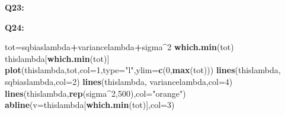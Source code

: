 \documentclass[]{article}
\newenvironment{Shaded}{\begin{snugshade}}{\end{snugshade}}
\newcommand{\KeywordTok}[1]{\textcolor[rgb]{0.13,0.29,0.53}{\textbf{#1}}}
\newcommand{\DataTypeTok}[1]{\textcolor[rgb]{0.13,0.29,0.53}{#1}}
\newcommand{\DecValTok}[1]{\textcolor[rgb]{0.00,0.00,0.81}{#1}}
\newcommand{\StringTok}[1]{\textcolor[rgb]{0.31,0.60,0.02}{#1}}
\newcommand{\CommentTok}[1]{\textcolor[rgb]{0.56,0.35,0.01}{\textit{#1}}}
\newcommand{\OtherTok}[1]{\textcolor[rgb]{0.56,0.35,0.01}{#1}}
\newcommand{\ControlFlowTok}[1]{\textcolor[rgb]{0.13,0.29,0.53}{\textbf{#1}}}
\newcommand{\OperatorTok}[1]{\textcolor[rgb]{0.81,0.36,0.00}{\textbf{#1}}}
\newcommand{\NormalTok}[1]{#1}
\begin{document}
\textbf{Q23:}

\begin{Shaded}
\end{Shaded}

\textbf{Q24:}

\begin{Shaded}
\begin{Highlighting}[]
\NormalTok{tot=sqbiaslambda}\OperatorTok{+}\NormalTok{variancelambda}\OperatorTok{+}\NormalTok{sigma}\OperatorTok{^}\DecValTok{2}
\KeywordTok{which.min}\NormalTok{(tot)}
\NormalTok{thislambda[}\KeywordTok{which.min}\NormalTok{(tot)]}
\KeywordTok{plot}\NormalTok{(thislambda,tot,}\DataTypeTok{col=}\DecValTok{1}\NormalTok{,}\DataTypeTok{type=}\StringTok{"l"}\NormalTok{,}\DataTypeTok{ylim=}\KeywordTok{c}\NormalTok{(}\DecValTok{0}\NormalTok{,}\KeywordTok{max}\NormalTok{(tot)))}
\KeywordTok{lines}\NormalTok{(thislambda, sqbiaslambda,}\DataTypeTok{col=}\DecValTok{2}\NormalTok{)}
\KeywordTok{lines}\NormalTok{(thislambda, variancelambda,}\DataTypeTok{col=}\DecValTok{4}\NormalTok{)}
\KeywordTok{lines}\NormalTok{(thislambda,}\KeywordTok{rep}\NormalTok{(sigma}\OperatorTok{^}\DecValTok{2}\NormalTok{,}\DecValTok{500}\NormalTok{),}\DataTypeTok{col=}\StringTok{"orange"}\NormalTok{)}
\KeywordTok{abline}\NormalTok{(}\DataTypeTok{v=}\NormalTok{thislambda[}\KeywordTok{which.min}\NormalTok{(tot)],}\DataTypeTok{col=}\DecValTok{3}\NormalTok{)}
\end{Highlighting}
\end{Shaded}
\end{document}
